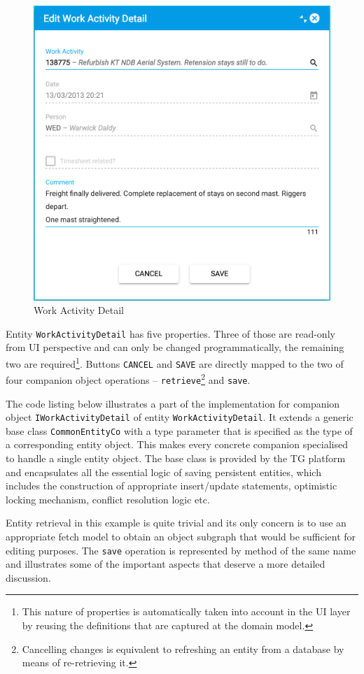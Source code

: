 \documentclass[a4paper,12pt,oneside,openright,final]{memoir} %
\begin{document}
	\begin{figure}[!h]
  		\centering
        \includegraphics[width=.55\textwidth]{images/06-wa-detail-master.png}  
        \caption{Work Activity Detail}
        \label{fig:wa-detail}
  	\end{figure}

	Entity \texttt{WorkActivityDetail} has five properties.
	Three of those are read-only from UI perspective and can only be changed programmatically, the remaining two are required\footnote{This nature of properties is automatically taken into account in the UI layer by reusing the definitions that are captured at the domain model.}.
	Buttons \texttt{CANCEL} and \texttt{SAVE} are directly mapped to the two of four companion object operations -- \texttt{retrieve}\footnote{Cancelling changes is equivalent to refreshing an entity from a database by means of re-retrieving it.} and \texttt{save}.

	The code listing below illustrates a part of the implementation for companion object \texttt{IWork\-Activity\-Detail} of entity \texttt{WorkActivityDetail}.
	It extends a generic base class \texttt{CommonEntityCo} with a type parameter that is specified as the type of a corresponding entity object.
	This makes every concrete companion specialised to handle a single entity object.
	The base class is provided by the TG platform and encapsulates all the essential logic of saving persistent entities, which includes the construction of appropriate insert/update statements, optimistic locking mechanism, conflict resolution logic etc.

	Entity retrieval in this example is quite trivial and its only concern is to use an appropriate fetch model to obtain an object subgraph that would be sufficient for editing purposes.
	The \texttt{save} operation is represented by method of the same name and illustrates some of the important aspects that deserve a more detailed discussion.
	
\end{document}
